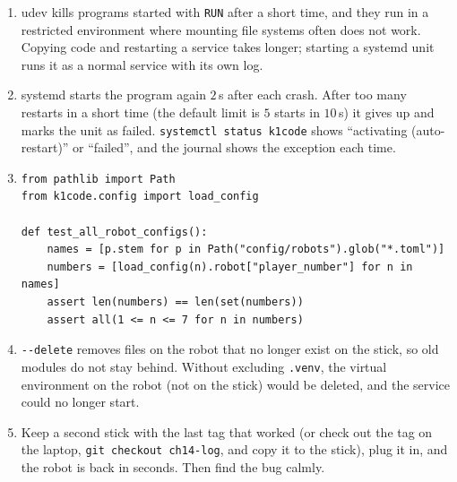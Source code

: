 \begin{enumerate}[label=\textbf{\ansnum.\arabic*}]
  \item udev kills programs started with \texttt{RUN} after a short time, and they run in a restricted environment where mounting file systems often does not work. Copying code and restarting a service takes longer; starting a systemd unit runs it as a normal service with its own log.
  \item systemd starts the program again $2$\,s after each crash. After too many restarts in a short time (the default limit is $5$ starts in $10$\,s) it gives up and marks the unit as failed. \verb!systemctl status k1code! shows ``activating (auto-restart)'' or ``failed'', and the journal shows the exception each time.
  \item
\begin{verbatim}
from pathlib import Path
from k1code.config import load_config

def test_all_robot_configs():
    names = [p.stem for p in Path("config/robots").glob("*.toml")]
    numbers = [load_config(n).robot["player_number"] for n in names]
    assert len(numbers) == len(set(numbers))
    assert all(1 <= n <= 7 for n in numbers)
\end{verbatim}
  \item \verb!--delete! removes files on the robot that no longer exist on the stick, so old modules do not stay behind. Without excluding \texttt{.venv}, the virtual environment on the robot (not on the stick) would be deleted, and the service could no longer start.
  \item Keep a second stick with the last tag that worked (or check out the tag on the laptop, \verb!git checkout ch14-log!, and copy it to the stick), plug it in, and the robot is back in seconds. Then find the bug calmly.
\end{enumerate}

